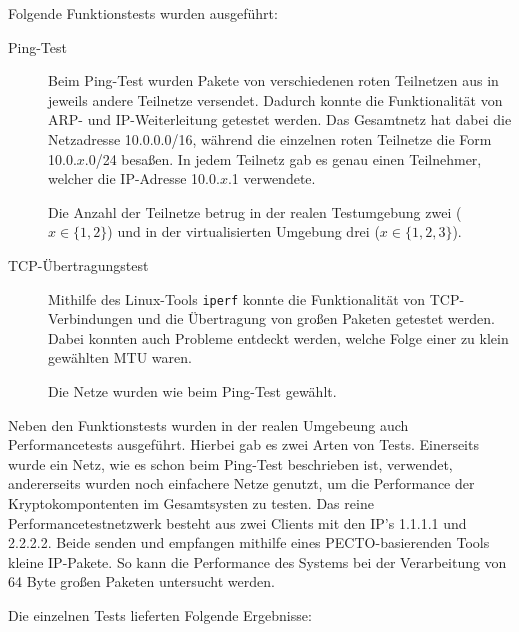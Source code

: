 Folgende Funktionstests wurden ausgeführt:

\begin{description}
\item[Ping-Test]
	Beim Ping-Test wurden Pakete von verschiedenen roten Teilnetzen aus in jeweils andere Teilnetze versendet. 
	Dadurch konnte die Funktionalität von ARP- und IP-Weiterleitung getestet werden. 
	Das Gesamtnetz hat dabei die Netzadresse 10.0.0.0/16, während die einzelnen roten Teilnetze die Form 10.0.$x$.0/24 besaßen.
	In jedem Teilnetz gab es genau einen Teilnehmer, welcher die IP-Adresse 10.0.$x$.1 verwendete.
	
	Die Anzahl der Teilnetze betrug in der realen Testumgebung zwei ($x \in \{1, 2\}$) und in der virtualisierten Umgebung drei ($x \in \{1, 2, 3\}$).

\item[TCP-Übertragungstest]
	Mithilfe des Linux-Tools \texttt{iperf} konnte die Funktionalität von TCP-Verbindungen und die Übertragung von großen Paketen getestet werden.
	Dabei konnten auch Probleme entdeckt werden, welche Folge einer zu klein gewählten MTU waren.
	
	Die Netze wurden wie beim Ping-Test gewählt.
\end{description}

Neben den Funktionstests wurden in der realen Umgebeung auch Performancetests ausgeführt.
Hierbei gab es zwei Arten von Tests. 
Einerseits wurde ein Netz, wie es schon beim Ping-Test beschrieben ist, verwendet, andererseits wurden noch einfachere Netze genutzt, um die Performance der Kryptokompontenten im Gesamtsysten zu testen.
Das reine Performancetestnetzwerk besteht aus zwei Clients mit den IP's 1.1.1.1 und 2.2.2.2.
Beide senden und empfangen mithilfe eines PECTO-basierenden Tools kleine IP-Pakete.
So kann die Performance des Systems bei der Verarbeitung von 64 Byte großen Paketen untersucht werden.

Die einzelnen Tests lieferten Folgende Ergebnisse:

